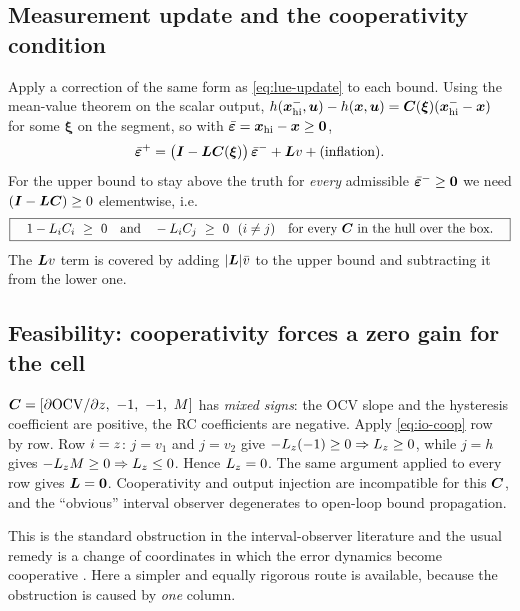 \subsection{Measurement update and the cooperativity condition}
Apply a correction of the same form as \eqref{eq:lue-update} to each bound.  Using the mean-value
theorem on the scalar output, $h(\bm{x}_{\mathrm{hi}}^-,\bm{u})-h(\bm{x},\bm{u}) = \bm{C}(\bm{\xi})
(\bm{x}_{\mathrm{hi}}^- - \bm{x})$ for some $\bm{\xi}$ on the segment, so with
$\bar{\bm{\varepsilon}} = \bm{x}_{\mathrm{hi}} - \bm{x} \ge \bm{0}$,
\begin{equation}
\bar{\bm{\varepsilon}}^+ = \big(\bm{I} - \bm{L}\bm{C}(\bm{\xi})\big)\,\bar{\bm{\varepsilon}}^- + \bm{L} v + \text{(inflation)} .
\label{eq:io-errup}
\end{equation}
For the upper bound to stay above the truth for \emph{every} admissible $\bar{\bm{\varepsilon}}^-\ge\bm{0}$
we need $(\bm{I}-\bm{L}\bm{C})\ge0$ elementwise, i.e.
\begin{equation}
\boxed{\quad 1 - L_i C_i \ \ge\ 0 \quad\text{and}\quad -L_i C_j \ \ge\ 0 \ \ (i\neq j)
\quad\text{for every } \bm{C} \text{ in the hull over the box.}\quad}
\label{eq:io-coop}
\end{equation}
The $\bm{L} v$ term is covered by adding $|\bm{L}|\bar{v}$ to the upper bound and subtracting it from
the lower one.

\subsection{Feasibility: cooperativity forces a zero gain for the cell}
\label{sec:io-feas}
$\mC = [\partial\ocv/\partial\soc,\ -1,\ -1,\ M]$ has \emph{mixed signs}: the OCV slope and the
hysteresis coefficient are positive, the RC coefficients are negative.  Apply \eqref{eq:io-coop}
row by row.  Row $i=z$: $j=v_1$ and $j=v_2$ give $-L_{z}(-1)\ge0\Rightarrow L_{z}\ge0$,
while $j=h$ gives $-L_{z}M\ge0\Rightarrow L_{z}\le0$.  Hence $L_{z}=0$.  The same
argument applied to every row gives $\bm{L} = \bm{0}$.  Cooperativity and output injection are
incompatible for this $\bm{C}$, and the ``obvious'' interval observer degenerates to open-loop
bound propagation.

This is the standard obstruction in the interval-observer literature and the usual remedy is a
change of coordinates in which the error dynamics become cooperative
\cite{raissi2012interval,mazenc2011interval}.  Here a simpler and equally rigorous route is
available, because the obstruction is caused by \emph{one} column.

